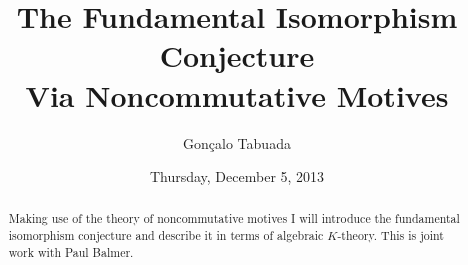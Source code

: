 \documentclass{UAmathtalk}
\author{Gon\c{c}alo Tabuada}
\title{The Fundamental Isomorphism Conjecture\\ Via Noncommutative Motives}
\date{Thursday, December 5, 2013}
\begin{document}
\maketitle

\begin{abstract}
Making use of the theory of noncommutative motives I will introduce the fundamental isomorphism conjecture and describe it in terms of algebraic $K$-theory.
This is joint work with Paul Balmer.
\end{abstract}
\end{document}
